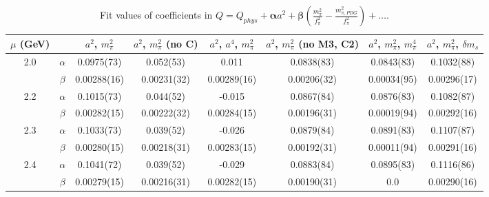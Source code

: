 \documentclass[12pt]{extarticle}
\begin{document}
\begin{table}[h!]
\begin{center}
\begin{tabular}{|c c|c|c|c|c|c|c|}
\hline
$\mu$ (GeV) &  & $a^2$, $m_\pi^2$& $a^2$, $m_\pi^2$ (no C)& $a^2$, $a^4$, $m_\pi^2$& $a^2$, $m_\pi^2$ (no M3, C2)& $a^2$, $m_\pi^2$, $m_\pi^4$& $a^2$, $m_\pi^2$, $\delta m_s$\\
\hline
\multirow{2}{0.5in}{2.0} & $\alpha$ & 0.0975(73)& 0.052(53)& 0.011& 0.0838(83)& 0.0843(83)& 0.1032(88)\\
 & $\beta$ & 0.00288(16)& 0.00231(32)& 0.00289(16)& 0.00206(32)& 0.00034(95)& 0.00296(17)\\
\hline
\multirow{2}{0.5in}{2.2} & $\alpha$ & 0.1015(73)& 0.044(52)& -0.015& 0.0867(84)& 0.0876(83)& 0.1082(87)\\
 & $\beta$ & 0.00282(15)& 0.00222(32)& 0.00284(15)& 0.00196(31)& 0.00019(94)& 0.00292(16)\\
\hline
\multirow{2}{0.5in}{2.3} & $\alpha$ & 0.1033(73)& 0.039(52)& -0.026& 0.0879(84)& 0.0891(83)& 0.1107(87)\\
 & $\beta$ & 0.00280(15)& 0.00218(31)& 0.00283(15)& 0.00192(31)& 0.00011(94)& 0.00291(16)\\
\hline
\multirow{2}{0.5in}{2.4} & $\alpha$ & 0.1041(72)& 0.039(52)& -0.029& 0.0883(84)& 0.0895(83)& 0.1116(86)\\
 & $\beta$ & 0.00279(15)& 0.00216(31)& 0.00282(15)& 0.00190(31)& 0.0& 0.00290(16)\\
\hline
\end{tabular}
\caption{Fit values of coefficients in $Q = Q_{phys} + \mathbf{\alpha} a^2 + \mathbf{\beta}\left(\frac{m_\pi^2}{f_\pi^2}-\frac{m_{\pi,PDG}^2}{f_\pi^2}\right) + \ldots$.}
\end{center}
\end{table}
























\clearpage
\end{document}
